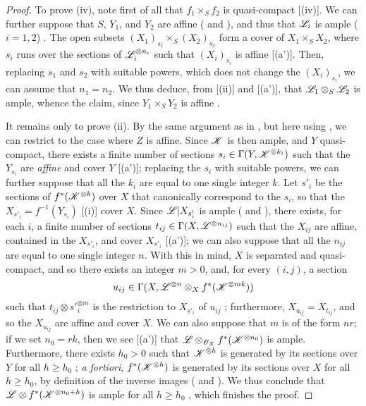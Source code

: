 \begin{proof}
To prove (iv), note first of all that $f_1\times_S f_2$ is quasi-compact [(iv)].
We can further suppose that $S$, $Y_1$, and $Y_2$ are affine ( and ), and thus that $\mathscr{L}_i$ is ample ($i=1,2$) .
The open subsets $(X_1)_{s_1}\times_S(X_2)_{s_2}$ form a cover of $X_1\times_S X_2$, where $s_i$ runs over the sections of $\mathscr{L}_i^{\otimes n_i}$ such that $(X_i)_{s_i}$ is affine [(a')].
Then, replacing $s_1$ and $s_2$ with suitable powers, which does not change the $(X_i)_{s_i}$, we can assume that $n_1=n_2$.
We thus deduce, from [(ii)] and [(a')], that $\mathscr{L}_1\otimes_S\mathscr{L}_2$ is ample, whence the claim, since $Y_1\times_S Y_2$ is affine .

It remains only to prove (ii).
By the same argument as in , but here using , we can restrict to the case where $Z$ is affine.
Since $\mathscr{K}$ is then ample, and $Y$ quasi-compact, there exists a finite number of sections $s_i\in\Gamma(Y,\mathscr{K}^{\otimes k_i})$ such that the $Y_{s_i}$
are \emph{affine} and cover $Y$ [(a')];
replacing the $s_i$ with suitable powers, we can further suppose that all the $k_i$ are equal to one single integer $k$.
Let $s'_i$ be the sections of $f^*(\mathscr{K}^{\otimes k})$ over $X$ that canonically correspond to the $s_i$, so that the $X_{s'_i}=f^{-1}(Y_{s_i})$ [(i)] cover $X$.
Since $\mathscr{L}|X_{s'_i}$ is ample ( and ), there exists, for each $i$, a finite number of sections $t_{ij}\in\Gamma(X,\mathscr{L}^{\otimes n_{ij}})$ such that the $X_{ij}$ are affine, contained in the $X_{s'_i}$, and cover $X_{s'_i}$ [(a')];
we can also suppose that all the $n_{ij}$ are equal to one single integer $n$.
With this in mind, $X$ is separated and quasi-compact, and so there exists an integer $m>0$, and, for every $(i,j)$, a section
\[
  u_{ij}\in\Gamma(X,\mathscr{L}^{\otimes n}\otimes_X f^*(\mathscr{K}^{\otimes mk}))
\]
such that $t_{ij}\otimes s'^{\otimes m}_i$ is the restriction to $X_{s'_i}$ of $u_{ij}$ ;
furthermore, $X_{u_{ij}}=X_{t_{ij}}$, and so the $X_{u_{ij}}$ are affine and cover $X$.
We can also suppose that $m$ is of the form $nr$;
if we set $n_0=rk$, then we see [(a')] that $\mathscr{L}\otimes_{\mathscr{O}_X}f^*(\mathscr{K}^{\otimes n_0})$ is ample.
Furthermore, there exists $h_0>0$ such that $\mathscr{K}^{\otimes h}$ is generated by its sections over $Y$ for all $h\geq h_0$ ;
\emph{a fortiori}, $f^*(\mathscr{K}^{\otimes h})$ is generated by its sections over $X$ for all $h\geq h_0$, by definition of the inverse images ( and ).
We thus conclude that $\mathscr{L}\otimes f^*(\mathscr{K}^{\otimes n_0+h})$ is ample for all $h\geq h_0$ , which finishes the proof.
\end{proof}

